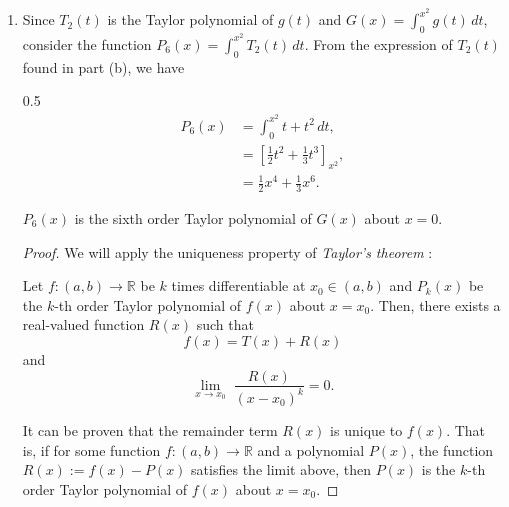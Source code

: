 \begin{enumerate}
\begin{enumerate}
                \bigskip

            \item Since $T_2(t)$ is the Taylor polynomial of $g(t)$ and $G(x) = \int_0^{x^2} g(t) \, dt$, consider the function $P_6(x) = \int_0^{x^2} T_2(t) \, dt$.
                From the expression of $T_2(t)$ found in part (b), we have
                \begin{spreadlines}{0.5\baselineskip}
                    \begin{align*}
                        P_6(x) &= \int_0^{x^2} t + t^2 \, dt, \\
                        &= \left[\frac{1}{2} t^2 + \frac{1}{3} t^3\right]_{x^2}, \\
                        &= \frac{1}{2} x^4 + \frac{1}{3} x^6.
                    \end{align*}
                \end{spreadlines}

                \medskip

                \begin{proposition} \label{prop:3c}
                    $P_6(x)$ is the sixth order Taylor polynomial of $G(x)$ about $x = 0$.
                \end{proposition}

                \smallskip

                \begin{proof}
                    We will apply the uniqueness property of \emph{Taylor's theorem} \parencite{taylors-theorem}:
                    \begin{theorem} \label{thm:taylor}
                        Let $f: (a, b) \to \mathbb{R}$ be $k$ times differentiable at $x_0 \in (a, b)$ and $P_k(x)$ be the $k$-th order Taylor polynomial of $f(x)$ about $x = x_0$.
                        Then, there exists a real-valued function $R(x)$ such that
                        \[ f(x) = T(x) + R(x) \]
                        and
                        \[ \lim_{x \to x_0} \; \frac{R(x)}{(x - x_0)^k} = 0. \]
                    \end{theorem}

                    \smallskip

                    It can be proven that the remainder term $R(x)$ is unique to $f(x)$.
                    That is, if for some function $f: (a, b) \to \mathbb{R}$ and a polynomial $P(x)$, the function $R(x) := f(x) - P(x)$ satisfies the limit above, then $P(x)$ is the $k$-th order Taylor polynomial of $f(x)$ about $x = x_0$.


\end{proof}
\end{enumerate}
\end{enumerate}
